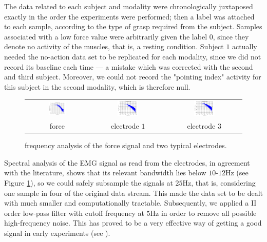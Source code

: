 The data related to each subject and modality were chronologically
juxtaposed exactly in the order the experiments were performed; then a
label was attached to each sample, according to the type of grasp
required from the subject. Samples associated with a low force value
were arbitrarily given the label $0$, since they denote no activity of
the muscles, that is, a resting condition. Subject $1$ actually needed
the no-action data set to be replicated for each modality, since we
did not record its baseline each time --- a mistake which was
corrected with the second and third subject. Moreover, we could not
record the "pointing index" activity for this subject in the second
modality, which is therefore null.

\begin{figure}[!ht] \centering
  \begin{tabular}{ccc}
    \includegraphics[width=0.3\textwidth]{figs/spectrum_force} &
    \includegraphics[width=0.3\textwidth]{figs/spectrum_electrode_1} &
    \includegraphics[width=0.3\textwidth]{figs/spectrum_electrode_3} \\
    force & electrode $1$ & electrode $3$ \\
  \end{tabular}
  \caption{frequency analysis of the force signal and two
    typical electrodes.}
  \label{fig:spectra}
\end{figure}

Spectral analysis of the EMG signal as read from the electrodes, in
agreement with the literature, shows that its relevant bandwidth lies
below $10$-$12$Hz (see Figure \ref{fig:spectra}), so we could safely
subsample the signals at $25$Hz, that is, considering one sample in
four of the original data stream. This made the data set to be dealt
with much smaller and computationally tractable. Subsequently, we
applied a II order low-pass filter with cutoff frequency at $5$Hz in
order to remove all possible high-frequency noise. This has proved to
be a very effective way of getting a good signal in early experiments
(see \cite{2008.Neurorob}).

